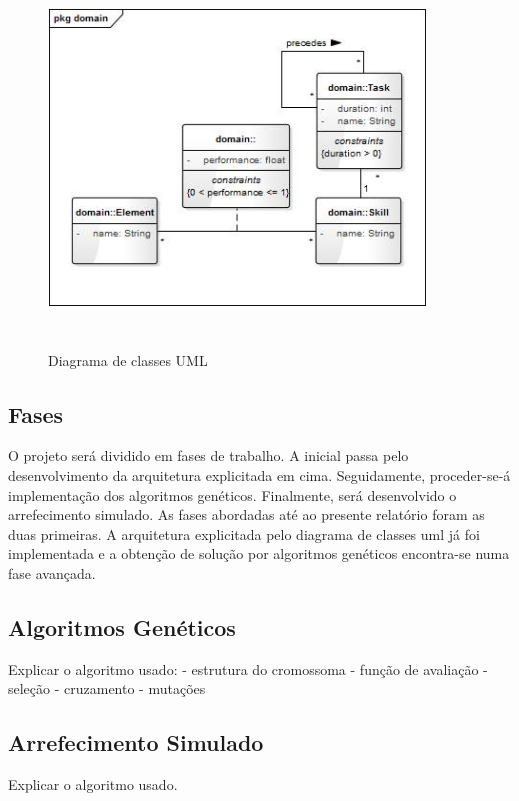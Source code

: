 \begin{titlepage}
\begin{figure}[h]
  \centering
    \includegraphics[width=10cm, height = 10cm]{uml.jpg}
  \caption{Diagrama de classes UML}
  \label{fig:uml}
\end{figure}

\subsection{Fases}
\justify\normalsize 
O projeto será dividido em fases de trabalho. A inicial passa pelo desenvolvimento da arquitetura explicitada em cima. Seguidamente, proceder-se-á implementação dos  algoritmos genéticos. Finalmente, será desenvolvido o arrefecimento simulado. As fases abordadas até ao presente relatório foram as duas primeiras. A arquitetura explicitada pelo diagrama de classes uml já foi implementada e a obtenção de solução por algoritmos genéticos encontra-se numa fase avançada.

\subsection{Algoritmos Genéticos}
\justify\normalsize
Explicar o algoritmo usado:
	- estrutura do cromossoma
	- função de avaliação
	- seleção
	- cruzamento
	- mutações

\subsection{Arrefecimento Simulado}
\justify\normalsize
Explicar o algoritmo usado.


\end{titlepage}
